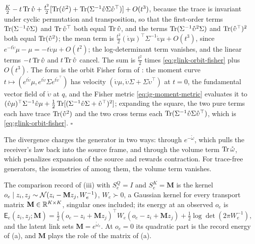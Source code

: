 \(\tfrac K2-t\operatorname{Tr}\mathring\upsilon+\tfrac{t^2}2[\operatorname{Tr}(\mathring\upsilon^2)+\operatorname{Tr}(\Sigma^{-1}\mathring\upsilon\Sigma\mathring\upsilon^\top)]+O(t^3)\),
because the trace is invariant under cyclic permutation and transposition, so that the first-order
terms \(\operatorname{Tr}(\Sigma^{-1}\mathring\upsilon\Sigma)\) and \(\operatorname{Tr}\mathring\upsilon^\top\) both equal
\(\operatorname{Tr}\mathring\upsilon\), and the terms \(\operatorname{Tr}(\Sigma^{-1}\mathring\upsilon^2\Sigma)\) and
\(\operatorname{Tr}(\mathring\upsilon^\top)^2\) both equal \(\operatorname{Tr}(\mathring\upsilon^2)\); the mean term is
\(\tfrac{t^2}2(\mathring\upsilon\mu)^\top\Sigma^{-1}\mathring\upsilon\mu+O(t^3)\), since
\(e^{-t\mathring\upsilon}\mu-\mu=-t\mathring\upsilon\mu+O(t^2)\); the log-determinant term vanishes, and the
linear terms \(-t\operatorname{Tr}\mathring\upsilon\) and \(t\operatorname{Tr}\mathring\upsilon\) cancel. The sum is
\(\tfrac{t^2}2\) times \eqref{eq:glink-orbit-fisher} plus \(O(t^3)\). The form is the orbit Fisher form of
: the moment curve
\(t\mapsto(e^{t\mathring\upsilon}\mu,e^{t\mathring\upsilon}\Sigma e^{t\mathring\upsilon^\top})\) has
velocity \((\mathring\upsilon\mu,\mathring\upsilon\Sigma+\Sigma\mathring\upsilon^\top)\) at \(t=0\),
the fundamental vector field of \(\mathring\upsilon\) at \(q\), and the Fisher metric
\eqref{eq:ig-moment-metric} evaluates it to
\((\mathring\upsilon\mu)^\top\Sigma^{-1}\mathring\upsilon\mu+\tfrac12\operatorname{Tr}[(\Sigma^{-1}\mathring\upsilon\Sigma+\mathring\upsilon^\top)^2]\);
expanding the square, the two pure terms each have trace \(\operatorname{Tr}(\mathring\upsilon^2)\) and the two
cross terms each \(\operatorname{Tr}(\Sigma^{-1}\mathring\upsilon\Sigma\mathring\upsilon^\top)\), which is
\eqref{eq:glink-orbit-fisher}.
\hfill$\square$

The divergence charges the generator in two ways: through \(e^{-\mathring\omega}\), which pulls the
receiver's law back into the source frame, and through the volume term \(\operatorname{Tr}\mathring\omega\), which
penalizes expansion of the source and rewards contraction. For trace-free generators, the
isometries of  among them, the volume term vanishes.

The comparison record of (iii) with \(S^Q_e=I\) and
\(S^K_e=\mathbf M\) is the kernel \(o_e\mid z_i,z_j\sim\mathcal N(z_i-\mathbf Mz_j,W_e^{-1})\),
\(W_e\succ0\), a Gaussian kernel for every transport matrix \(\mathbf M\in\mathbb R^{K\times K}\), singular ones
included; its energy at an
observed \(o_e\) is
\begin{equation}
\mathsf E_e(z_i,z_j;\mathbf M)
=\tfrac12(o_e-z_i+\mathbf Mz_j)^\top W_e(o_e-z_i+\mathbf Mz_j)+\tfrac12\log\det(2\pi W_e^{-1}),
\label{eq:glink-record-energy}
\end{equation}
and the latent link sets \(\mathbf M=e^{\mathring\omega_e}\). At \(o_e=0\) its quadratic part is the record
energy of (a), and \(\mathbf M\) plays the role of the matrix of
(a).


